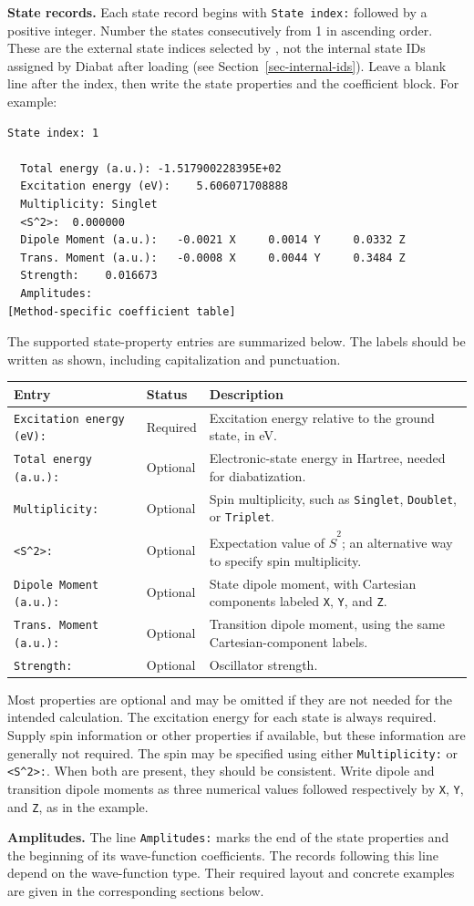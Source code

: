 \textbf{State records.} Each state record begins with \texttt{State index:} followed by a positive integer. Number the states consecutively from 1 in ascending order. These are the external state indices selected by , not the internal state IDs assigned by Diabat after loading (see Section~\ref{sec-internal-ids}). Leave a blank line after the index, then write the state properties and the coefficient block. For example:
\begin{lstlisting}[style=technicalfile]
State index: 1

  Total energy (a.u.): -1.517900228395E+02
  Excitation energy (eV):    5.606071708888
  Multiplicity: Singlet
  <S^2>:  0.000000
  Dipole Moment (a.u.):   -0.0021 X     0.0014 Y     0.0332 Z
  Trans. Moment (a.u.):   -0.0008 X     0.0044 Y     0.3484 Z
  Strength:    0.016673
  Amplitudes:
[Method-specific coefficient table]
\end{lstlisting}
The supported state-property entries are summarized below. The labels should be written as shown, including capitalization and punctuation.
\begin{longtable}{p{}p{}p{}}
\rowcolor{backgray}\textbf{Entry} & \textbf{Status} & \textbf{Description}\\\hline
\texttt{Excitation energy (eV):} & Required & Excitation energy relative to the ground state, in eV.\\
\texttt{Total energy (a.u.):} & Optional & Electronic-state energy in Hartree, needed for diabatization.\\
\texttt{Multiplicity:} & Optional & Spin multiplicity, such as \texttt{Singlet}, \texttt{Doublet}, or \texttt{Triplet}.\\
\texttt{<S\textasciicircum{}2>:} & Optional & Expectation value of $\hat S^2$; an alternative way to specify spin multiplicity.\\
\texttt{Dipole Moment (a.u.):} & Optional & State dipole moment, with Cartesian components labeled \texttt{X}, \texttt{Y}, and \texttt{Z}.\\
\texttt{Trans. Moment (a.u.):} & Optional & Transition dipole moment, using the same Cartesian-component labels.\\
\texttt{Strength:} & Optional & Oscillator strength.\\\hline
\end{longtable}
Most properties are optional and may be omitted if they are not needed for the intended calculation. The excitation energy for each state is always required. Supply spin information or other properties if available, but these information are generally not required. The spin may be specified using either \texttt{Multiplicity:} or \texttt{<S\textasciicircum{}2>:}. When both are present, they should be consistent. Write dipole and transition dipole moments as three numerical values followed respectively by \texttt{X}, \texttt{Y}, and \texttt{Z}, as in the example.

\textbf{Amplitudes.} The line \texttt{Amplitudes:} marks the end of the state properties and the beginning of its wave-function coefficients. The records following this line depend on the wave-function type. Their required layout and concrete examples are given in the corresponding sections below.